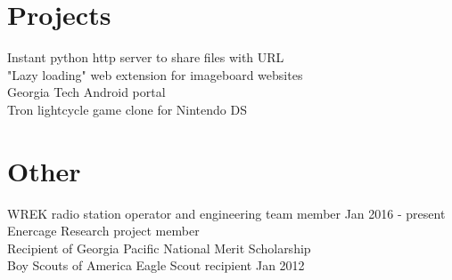 \documentclass[line, margin]{resume}
\begin{document}
\section{Projects}
Instant python http server to share files with URL\\
"Lazy loading" web extension for imageboard websites \\
Georgia Tech Android portal \\
Tron lightcycle game clone for Nintendo DS \\

\section{Other}
WREK radio station operator and engineering team member \hfill Jan 2016 - present \\
Enercage Research project member\\
Recipient of Georgia Pacific National Merit Scholarship \\
Boy Scouts of America Eagle Scout recipient \hfill Jan 2012 \\
\end{document}
